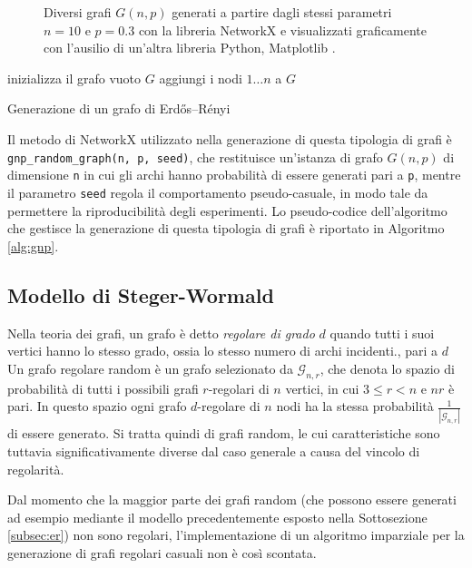 \begin{figure}[h!]
\begin{subfigure}[b]{0.29\textwidth}
     \end{subfigure}
        \caption{Diversi grafi $G(n,p)$ generati a partire dagli stessi parametri $n=10$ e $p=0.3$ con la libreria NetworkX e visualizzati graficamente con l'ausilio di un'altra libreria Python, Matplotlib \cite{Hunter2007}.}
        \label{fig:gnpes}
\end{figure}

\begin{algorithm}
\SetAlgoLined
{}
 inizializza il grafo vuoto $G$\;
 aggiungi i nodi $1 \dots n$ a $G$\;
 \caption{Generazione di un grafo di Erdős–Rényi}
 \label{alg:gnp}
\end{algorithm}

Il metodo di NetworkX utilizzato nella generazione di questa tipologia di grafi è \linebreak
\texttt{gnp\_random\_graph(n, p, seed)}, che restituisce un'istanza di grafo $G(n,p)$ di dimensione \texttt{n} in cui gli archi hanno probabilità di essere generati pari a \texttt{p}, mentre il parametro \texttt{seed} regola il comportamento pseudo-casuale, in modo tale da permettere la riproducibilità degli esperimenti. Lo pseudo-codice dell'algoritmo che gestisce la generazione di questa tipologia di grafi è riportato in Algoritmo \ref{alg:gnp}.

\subsection{Modello di Steger-Wormald}
\label{subsec:steger}
Nella teoria dei grafi, un grafo è detto \textit{regolare di grado} $d$ quando tutti i suoi vertici hanno lo stesso grado, ossia lo stesso numero di archi incidenti., pari a $d$ Un grafo regolare random è un grafo selezionato da $\mathcal{G}_{n,r}$, che denota lo spazio di probabilità di tutti i possibili grafi $r$-regolari di $n$ vertici, in cui $3\leq r < n$ e $nr$ è pari. In questo spazio ogni grafo $d$-regolare di $n$ nodi ha la stessa probabilità $\frac{1}{|\mathcal{G}_{n,r}|}$ di essere generato. Si tratta quindi di grafi random, le cui caratteristiche sono tuttavia significativamente diverse dal caso generale a causa del vincolo di regolarità.

Dal momento che la maggior parte dei grafi random (che possono essere generati ad esempio mediante il modello precedentemente esposto nella Sottosezione \ref{subsec:er}) non sono regolari, l'implementazione di un algoritmo imparziale per la generazione di grafi regolari casuali non è così scontata. 

